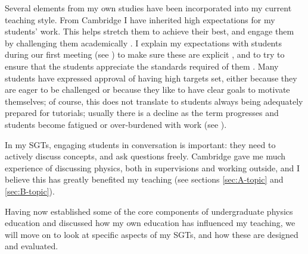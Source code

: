 Several elements from my own studies have been incorporated into my current teaching style. From Cambridge I have inherited high expectations for my students' work. This helps stretch them to achieve their best, and engage them by challenging them academically \citep{Bamber2015}. I explain my expectations with students during our first meeting (see ) to make sure these are explicit \citep{Butcher2015}, and to try to ensure that the students appreciate the standards required of them \citep[chapter 8]{Ramsden1992}. Many students have expressed approval of having high targets set, either because they are eager to be challenged or because they like to have clear goals to motivate themselves; of course, this does not translate to students always being adequately prepared for tutorials; usually there is a decline as the term progresses and students become fatigued or over-burdened with work (see ).

In my SGTs, engaging students in conversation is important: they need to actively discuss concepts, and ask questions freely. Cambridge gave me much experience of discussing physics, both in supervisions and working outside, and I believe this has greatly benefited my teaching (see sections \ref{sec:A-topic} and \ref{sec:B-topic}).

Having now established some of the core components of undergraduate physics education and discussed how my own education has influenced my teaching, we will move on to look at specific aspects of my SGTs, and how these are designed and evaluated.
